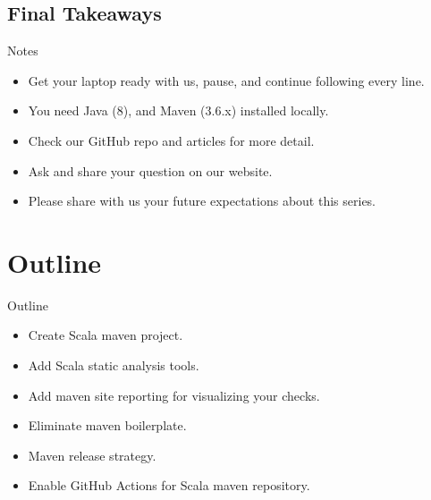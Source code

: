 \documentclass[
    aspectratio=1610
]{beamer}
\begin{document}
    \subsection{Final Takeaways}\label{subsec:final-takeaways}
    \begin{frame}{Notes}
        \begin{itemize}[<+- | alert@+>]
            \item Get your laptop ready with us, pause, and continue following every line.
            \item You need Java (8), and Maven (3.6.x) installed locally.
            \item Check our GitHub repo and articles for more detail.
            \item Ask and share your question on our website.
            \item Please share with us your future expectations about this series.
        \end{itemize}
    \end{frame}




    \section{Outline}\label{sec:outline}

    \begin{frame}{Outline}
        \begin{itemize}[<+- | alert@+>]
            \item Create Scala maven project.
            \item Add Scala static analysis tools.
            \item Add maven site reporting for visualizing your checks.
            \item Eliminate maven boilerplate.
            \item Maven release strategy.
            \item Enable GitHub Actions for Scala maven repository.
        \end{itemize}
    \end{frame}
\end{document}
